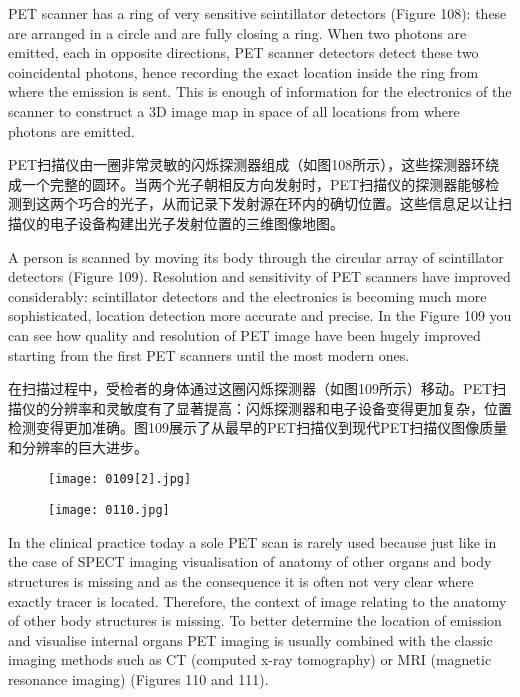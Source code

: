 \documentclass[dvipsnames, svgnames,a4paper,11pt]{article}
\begin{document}
PET scanner has a ring of very sensitive scintillator detectors (Figure 108): these are
arranged in a circle and are fully closing a ring. When two photons are emitted, each
in opposite directions, PET scanner detectors detect these two coincidental photons,
hence recording the exact location inside the ring from where the emission is sent.
This is enough of information for the electronics of the scanner to construct a 3D
image map in space of all locations from where photons are emitted.

PET扫描仪由一圈非常灵敏的闪烁探测器组成（如图108所示），这些探测器环绕成一个完整的圆环。当两个光子朝相反方向发射时，PET扫描仪的探测器能够检测到这两个巧合的光子，从而记录下发射源在环内的确切位置。这些信息足以让扫描仪的电子设备构建出光子发射位置的三维图像地图。



A person is scanned by moving its body through the circular array of scintillator
detectors (Figure 109). Resolution and sensitivity of PET scanners have improved
considerably: scintillator detectors and the electronics is becoming much more
sophisticated, location detection more accurate and precise. In the Figure 109 you can see how quality and resolution of PET image have been hugely improved
starting from the first PET scanners until the most modern ones.

在扫描过程中，受检者的身体通过这圈闪烁探测器（如图109所示）移动。PET扫描仪的分辨率和灵敏度有了显著提高：闪烁探测器和电子设备变得更加复杂，位置检测变得更加准确。图109展示了从最早的PET扫描仪到现代PET扫描仪图像质量和分辨率的巨大进步。

\begin{figure}[H]
    \centering
    \texttt{[image: 0109[2].jpg]}
     \label{fig109}
\end{figure}

\begin{figure}[h]
    \centering
    \texttt{[image: 0110.jpg]}
     \label{fig110}
\end{figure}



In the clinical practice today a sole PET scan is rarely used because just like in the
case of SPECT imaging visualisation of anatomy of other organs and body
structures is missing and as the consequence it is often not very clear where exactly
tracer is located. Therefore, the context of image relating to the anatomy of other
body structures is missing. To better determine the location of emission and visualise
internal organs PET imaging is usually combined with the classic imaging methods
such as CT (computed x-ray tomography) or MRI (magnetic resonance imaging)
(Figures 110 and 111).
\end{document}
